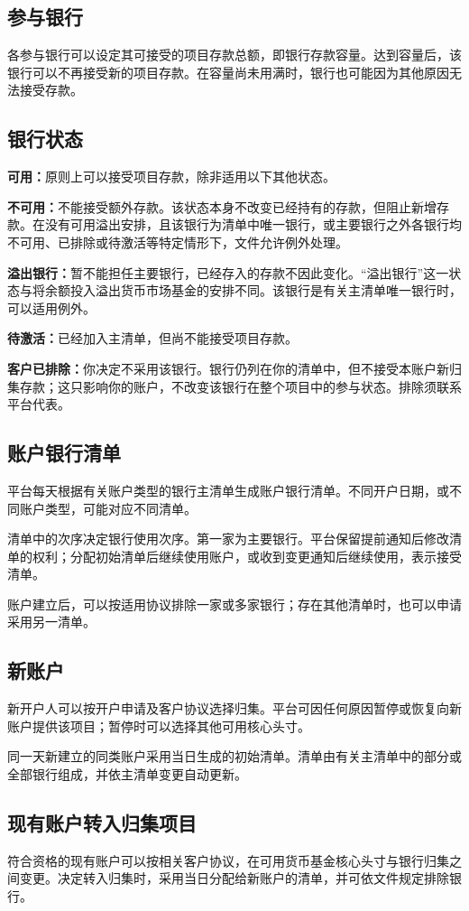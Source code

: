 \documentclass[UTF8,fontset=none,11pt,a4paper]{ctexart}
\begin{document}
\subsection*{参与银行}
各参与银行可以设定其可接受的项目存款总额，即银行存款容量。达到容量后，该银行可以不再接受新的项目存款。在容量尚未用满时，银行也可能因为其他原因无法接受存款。


\subsection*{银行状态}
\textbf{可用：}原则上可以接受项目存款，除非适用以下其他状态。


\textbf{不可用：}不能接受额外存款。该状态本身不改变已经持有的存款，但阻止新增存款。在没有可用溢出安排，且该银行为清单中唯一银行，或主要银行之外各银行均不可用、已排除或待激活等特定情形下，文件允许例外处理。


\textbf{溢出银行：}暂不能担任主要银行，已经存入的存款不因此变化。“溢出银行”这一状态与将余额投入溢出货币市场基金的安排不同。该银行是有关主清单唯一银行时，可以适用例外。


\textbf{待激活：}已经加入主清单，但尚不能接受项目存款。


\textbf{客户已排除：}你决定不采用该银行。银行仍列在你的清单中，但不接受本账户新归集存款；这只影响你的账户，不改变该银行在整个项目中的参与状态。排除须联系平台代表。


\subsection*{账户银行清单}
平台每天根据有关账户类型的银行主清单生成账户银行清单。不同开户日期，或不同账户类型，可能对应不同清单。


清单中的次序决定银行使用次序。第一家为主要银行。平台保留提前通知后修改清单的权利；分配初始清单后继续使用账户，或收到变更通知后继续使用，表示接受清单。


账户建立后，可以按适用协议排除一家或多家银行；存在其他清单时，也可以申请采用另一清单。


\subsection*{新账户}
新开户人可以按开户申请及客户协议选择归集。平台可因任何原因暂停或恢复向新账户提供该项目；暂停时可以选择其他可用核心头寸。


同一天新建立的同类账户采用当日生成的初始清单。清单由有关主清单中的部分或全部银行组成，并依主清单变更自动更新。


\subsection*{现有账户转入归集项目}
符合资格的现有账户可以按相关客户协议，在可用货币基金核心头寸与银行归集之间变更。决定转入归集时，采用当日分配给新账户的清单，并可依文件规定排除银行。
\end{document}
